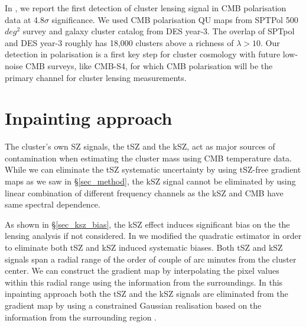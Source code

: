  In \citet{raghunathan19}, we report the first detection of cluster lensing signal in CMB polarisation data at 4.8$\sigma$ significance. We used CMB polarisation QU maps from SPTPol 500 $deg^{2}$ survey and galaxy cluster catalog from DES year-3. The overlap of SPTpol and DES year-3 roughly has 18,000 clusters above a richness of $\lambda  > 10$. %
 Our detection in polarisation is a first key step for cluster cosmology with future low-noise CMB surveys, like CMB-S4, for which 
 CMB polarisation will be the primary channel for cluster lensing measurements.  
 \section{Inpainting approach}
 \label{inpaint}
The cluster's own SZ signals, the tSZ and the kSZ, act as major sources of contamination when estimating the cluster mass using CMB temperature data. 
 While we can eliminate the tSZ systematic uncertainty by using tSZ-free gradient maps as we saw in \S\ref{sec_method}, the kSZ signal cannot be eliminated by using linear combination of different frequency channels as the kSZ and CMB have same spectral dependence. 
 
As shown in \S\ref{sec_ksz_bias}, the kSZ effect induces significant bias on the the lensing analysis if not considered. 
 In \citet{raghunathan19_in} we modified the quadratic estimator in order to eliminate both tSZ and kSZ induced systematic biases. 
Both tSZ and kSZ signals span a radial range of the order of couple of arc minutes from the cluster center.
 We can construct the gradient map by interpolating the pixel values within this radial range using the information from the surroundings.
 In this inpainting approach both the tSZ and the kSZ signals are eliminated from the gradient map by using a constrained Gaussian realisation based on the information from the surrounding region \citet{benoitlevy13}.
 
